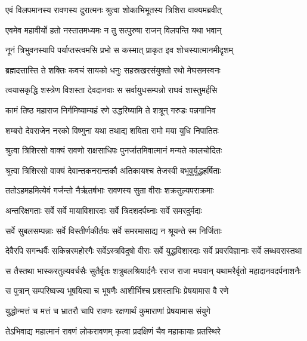
\twolineshloka
{एवं विलपमानस्य रावणस्य दुरात्मनः}
{श्रुत्वा शोकाभिभूतस्य त्रिशिरा वाक्यमब्रवीत्} %

\twolineshloka
{एवमेव महावीर्यो हतो नस्तातमध्यमः}
{न तु सत्पुरुषा राजन् विलपन्ति यथा भवान्} %

\twolineshloka
{नूनं त्रिभुवनस्यापि पर्याप्तस्त्वमसि प्रभो}
{स कस्मात् प्राकृत इव शोचस्यात्मानमीदृशम्} %

\twolineshloka
{ब्रह्मदत्तास्ति ते शक्तिः कवचं सायको धनुः}
{सहस्रखरसंयुक्तो रथो मेघसमस्वनः} %

\twolineshloka
{त्वयासकृद्धि शस्त्रेण विशस्ता देवदानवाः}
{स सर्वायुधसम्पन्नो राघवं शास्तुमर्हसि} %

\twolineshloka
{कामं तिष्ठ महाराज निर्गमिष्याम्यहं रणे}
{उद्धरिष्यामि ते शत्रून् गरुडः पन्नगानिव} %

\twolineshloka
{शम्बरो देवराजेन नरको विष्णुना यथा}
{तथाद्य शयिता रामो मया युधि निपातितः} %

\twolineshloka
{श्रुत्वा त्रिशिरसो वाक्यं रावणो राक्षसाधिपः}
{पुनर्जातमिवात्मानं मन्यते कालचोदितः} %

\twolineshloka
{श्रुत्वा त्रिशिरसो वाक्यं देवान्तकनरान्तकौ}
{अतिकायश्च तेजस्वी बभूवुर्युद्धहर्षिताः} %

\twolineshloka
{ततोऽहमहमित्येवं गर्जन्तो नैर्ऋतर्षभाः}
{रावणस्य सुता वीराः शक्रतुल्यपराक्रमाः} %

\twolineshloka
{अन्तरिक्षगताः सर्वे सर्वे मायाविशारदाः}
{सर्वे त्रिदशदर्पघ्नाः सर्वे समरदुर्मदाः} %

\twolineshloka
{सर्वे सुबलसम्पन्नाः सर्वे विस्तीर्णकीर्तयः}
{सर्वे समरमासाद्य न श्रूयन्ते स्म निर्जिताः} %

\threelineshloka
{देवैरपि सगन्धर्वैः सकिन्नरमहोरगैः}
{सर्वेऽस्त्रविदुषो वीराः सर्वे युद्धविशारदाः}
{सर्वे प्रवरविज्ञानाः सर्वे लब्धवरास्तथा} %

\twolineshloka
{स तैस्तथा भास्करतुल्यवर्चसैः सुतैर्वृतः शत्रुबलश्रियार्दनैः}
{रराज राजा मघवान् यथामरैर्वृतो महादानवदर्पनाशनैः} %

\twolineshloka
{स पुत्रान् सम्परिष्वज्य भूषयित्वा च भूषणैः}
{आशीर्भिश्च प्रशस्ताभिः प्रेषयामास वै रणे} %

\twolineshloka
{युद्धोन्मत्तं च मत्तं च भ्रातरौ चापि रावणः}
{रक्षणार्थं कुमाराणां प्रेषयामास संयुगे} %

\twolineshloka
{तेऽभिवाद्य महात्मानं रावणं लोकरावणम्}
{कृत्वा प्रदक्षिणं चैव महाकायाः प्रतस्थिरे} %

